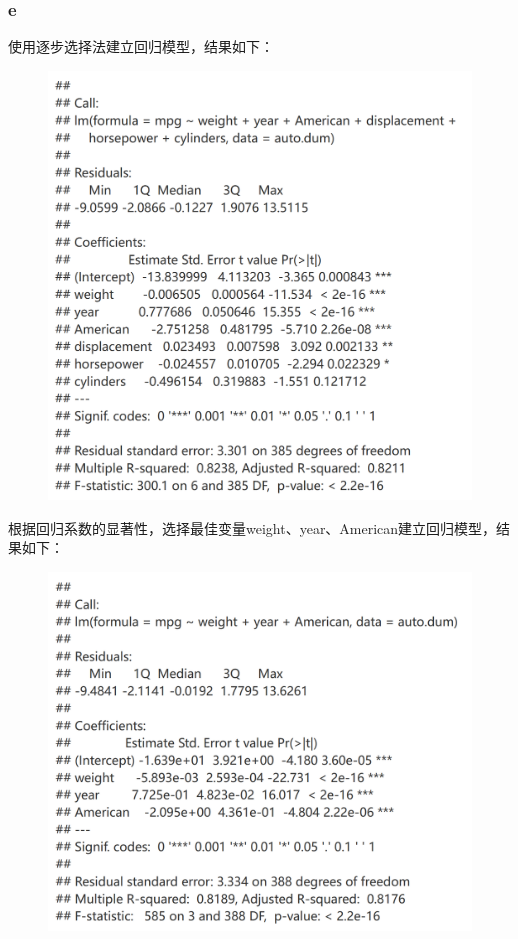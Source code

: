 \documentclass[12pt,a4paper]{article}
\begin{document}
    \subsubsection*{e}
    使用逐步选择法建立回归模型，结果如下：
    \begin{figure}[H]
        \centering
        \includegraphics[scale=0.3]{StepwiseAuto.png}
    \end{figure}
    根据回归系数的显著性，选择最佳变量weight、year、American建立回归模型，结果如下：
    \begin{figure}[H]
        \centering
        \includegraphics[scale=0.3]{Stepwise3.png}
    \end{figure}
\end{document}
